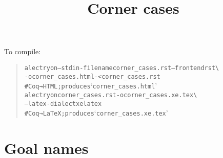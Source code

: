 \documentclass[a4paper]{article}
\title{Corner cases%
  \label{corner-cases}}
\author{}
\date{}
\begin{document}
\maketitle

To compile:

\begin{quote}
\begin{alltt}
alectryon --stdin-filename corner_cases.rst --frontend rst \textbackslash{}
  -o corner_cases.html - < corner_cases.rst
    # Coq → HTML; produces ‘corner_cases.html’
alectryon corner_cases.rst -o corner_cases.xe.tex \textbackslash{}
  --latex-dialect xelatex
    # Coq → LaTeX; produces ‘corner_cases.xe.tex’
\end{alltt}
\end{quote}


\section{Goal names%
  \label{goal-names}%
}
\end{document}
